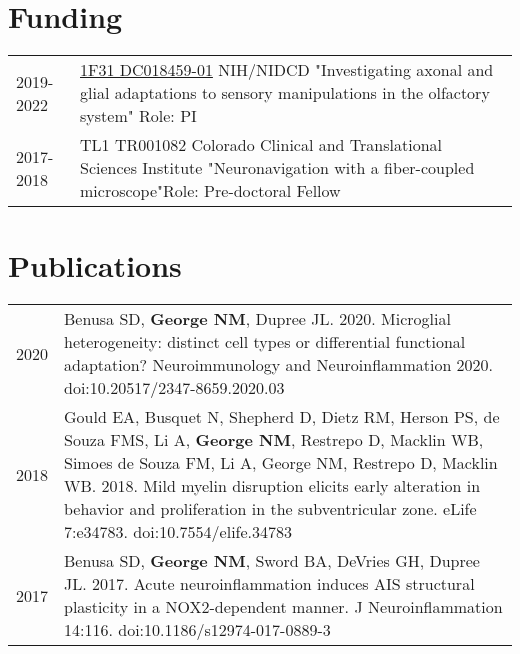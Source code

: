 \documentclass[11pt]{article}
\begin{document}
\section*{Funding}
\label{sec:orgd546732}
\begin{tabular}{lp{}}
2019-2022& \href{https://projectreporter.nih.gov/project_info_details.cfm?aid=9909888&icde=50328886&ddparam=&ddvalue=&ddsub=&cr=1&csb=default&cs=ASC&pball=}{1F31 DC018459-01} \newline NIH/NIDCD \newline "Investigating axonal and glial adaptations to sensory manipulations in the olfactory system" \newline Role: PI \\
2017-2018& TL1 TR001082 \newline Colorado Clinical and Translational Sciences Institute \newline "Neuronavigation with a fiber-coupled microscope"\newline Role: Pre-doctoral Fellow
\end{tabular}

\section*{Publications}
\label{sec:org5da5030}
\begin{tabular}{lp{}}

2020& Benusa SD, \textbf{George NM}, Dupree JL. 2020. Microglial heterogeneity: distinct cell types or differential functional adaptation? Neuroimmunology and Neuroinflammation 2020. doi:10.20517/2347-8659.2020.03\\

2018& Gould EA, Busquet N, Shepherd D, Dietz RM, Herson PS, de Souza FMS, Li A, \textbf{George NM}, Restrepo D, Macklin WB, Simoes de Souza FM, Li A, George NM, Restrepo D, Macklin WB. 2018. Mild myelin disruption elicits early alteration in behavior and proliferation in the subventricular zone. eLife 7:e34783. doi:10.7554/elife.34783\\

2017& Benusa SD, \textbf{George NM}, Sword BA, DeVries GH, Dupree JL. 2017. Acute neuroinflammation induces AIS structural plasticity in a NOX2-dependent manner. J Neuroinflammation 14:116. doi:10.1186/s12974-017-0889-3\\

\end{tabular}
\end{document}
